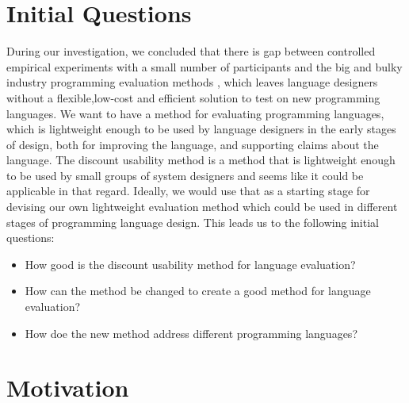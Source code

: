 \section{Initial Questions}
During our investigation, we concluded that there is gap between  controlled empirical experiments with a small number of participants and the big and bulky industry programming evaluation methods , which leaves language designers without a flexible,low-cost and efficient solution to test on new programming languages. We want to have a method for evaluating programming languages, which is lightweight enough to be used by language designers in the early stages of design, both for improving the language, and supporting claims about the language. The discount usability method is a method that is lightweight enough to be used by small groups of system designers and seems like it could be applicable in that regard. Ideally, we would use that as a starting stage for devising our own lightweight evaluation method which could be used in different stages of programming language design. This leads us to the following initial questions:

\begin{itemize}
\item How good is the discount usability method for language evaluation?
\item How can the method be changed to create a good method for language evaluation?
\item How doe the new method address different programming languages?
\end{itemize}

\section{Motivation}